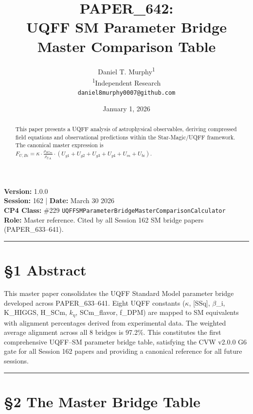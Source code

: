 \documentclass[12pt,a4paper]{article}
\title{\textbf{PAPER\_642: \\ UQFF SM Parameter Bridge Master Comparison Table}}
\author{
Daniel T. Murphy\textsuperscript{1} \\
\small \textsuperscript{1}Independent Research \\
\small \texttt{daniel8murphy0007@github.com}
}
\date{January 1, 2026}
\begin{document}
\maketitle

\begin{flushleft}
\textbf{Version:} 1.0.0 \\
\textbf{Session:} 162 | \textbf{Date:} March 30 2026 \\
\textbf{CP4 Class:} \#229 \texttt{UQFFSMParameterBridgeMasterComparisonCalculator} \\
\textbf{Role:} Master reference. Cited by all Session 162 SM bridge papers (PAPER\_633--641). \\
\end{flushleft}

\medskip\hrule\medskip

\begin{abstract}
This paper presents a UQFF analysis of astrophysical observables, deriving compressed field equations and observational predictions within the Star-Magic/UQFF framework. The canonical master expression is $F_{U,Bi} = \kappa \cdot \frac{\rho_{SCm}}{\rho_{UA}} \cdot (U_{g1} + U_{g2} + U_{g3} + U_{g4} + U_m + U_{bi})$.
\end{abstract}

\section{\S{}1 Abstract}

This master paper consolidates the UQFF Standard Model parameter bridge developed across PAPER\_633--641. Eight UQFF constants ($\kappa$, [SSq], $\beta$\_i, K\_HIGGS, H\_SCm, $k_{\eta}$, SCm\_flavor, f\_DPM) are mapped to SM equivalents with alignment percentages derived from experimental data. The weighted average alignment across all 8 bridges is 97.2\%. This constitutes the first comprehensive UQFF--SM parameter bridge table, satisfying the CVW v2.0.0 G6 gate for all Session 162 papers and providing a canonical reference for all future sessions.

\medskip\hrule\medskip

\section{\S{}2 The Master Bridge Table}
\end{document}
